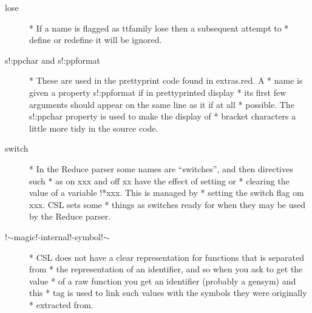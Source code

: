 \documentclass[a4paper,11pt]{article}
\begin{document}
\begin{description}

\item [{\ttfamily lose}] 
  * If a name is flagged as {ttfamily lose} then a subsequent attempt to
  * define or redefine it will be ignored.

\item [{\ttfamily s!:ppchar} and {\ttfamily s!:ppformat}] 
  * These are used in the prettyprint code found in {\ttfamily extras.red}. A
  * name is given a property {\ttfamily s!:ppformat} if in prettyprinted display
  * its first few arguments should appear on the same line as it if at all
  * possible. The {\ttfamily s!:ppchar} property is used to make the display of
  * bracket characters a little more tidy in the source code.

\item [{\ttfamily switch}] 
  * In the Reduce parser some names are ``switches'', and then directives such
  * as {\ttfamily on xxx} and {\ttfamily off xx} have the effect of setting or
  * clearing the value of a variable {\ttfamily !*xxx}. This is managed by
  * setting the {\ttfamily switch} flag om {\ttfamily xxx}. CSL sets some
  * things as switches ready for when they may be used by the Reduce parser.

\item [{\ttfamily !$\sim$magic!-internal!-symbol!$\sim$}] 
  * CSL does not have a clear representation for functions that is separated from
  * the representation of an identifier, and so when you ask to get the value
  * of a raw function you get an identifier (probably a gensym) and this
  * tag is used to link such values with the symbols they were originally
  * extracted from.

\end{description} %

\end{document}
